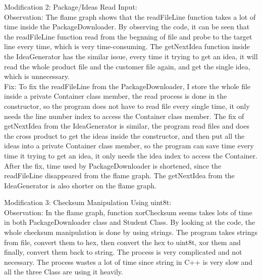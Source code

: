\documentclass[12pt]{article}
\begin{document}
\noindent Modification 2: Package/Ideas Read Input:\\

\indent Observation: The flame graph shows that the readFileLine function takes a lot of time inside the PackageDownloader. By observing the code, it can be seen that the readFileLine function read from the begnning of file and probe to the target line every time, which is very time-consuming. The getNextIdea function inside the IdeaGenerator has the similar issue, every time it trying to get an idea, it will read the whole product file and the customer file again, and get the single idea, which is unnecessary.\\

\indent Fix: To fix the readFileLine from the PackageDownloader, I store the whole file inside a private Container class member, the read process is done in the constructor, so the program does not have to read file every single time, it only needs the line number index to access the Container class member. The fix of getNextIdea from the IdeaGenerator is similar, the program read files and does the cross product to get the ideas inside the constructor, and then put all the ideas into a private Container class member, so the program can save time every time it trying to get an idea, it only needs the idea index to access the Container. After the fix, time used by PackageDownloader is shortened, since the readFileLine disappeared from the flame graph. The getNextIdea  from the IdeaGenerator is also shorter on the flame graph.\\
\newline %



\noindent Modification 3: Checksum Manipulation Using uint8\textunderscore t:\\

\indent Observation: In the flame graph, function xorChecksum seems takes lots of time in both PackageDownloader class and Student Class. By looking at the code, the whole checksum manipulation is done by using strings. The program takes strings from file, convert them to hex, then convert the hex to uint8\textunderscore t, xor them and finally, convert them back to string. The process is very complicated and not necessary. The process wastes a lot of time since string in C++ is very slow and all the three Class are using it heavily.\\
\end{document}
